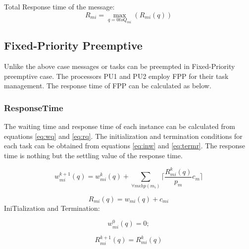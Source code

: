 Total Response time of the message:
\begin{equation}
R_{mi}=\max_{q=0toQ_{mi}}(R_{mi}(q)) 
\label{eq:respfinal}
\end{equation}


\subsection{Fixed-Priority Preemptive}
Unlike the above case messages or tasks can be preempted in Fixed-Priority preemptive case. The processors PU1 and PU2 employ FPP for their task management. The response time of FPP can be calculated as below.
\subsubsection{ResponseTime}
The waiting time and response time of each instance can be calculated from equations \ref{eq:wq} and \ref{eq:rq}. The initialization and termination conditions for each task can be obtained from equations \ref{eq:inw} and \ref{eq:termr}. The response time is nothing but the settling value of the response time.  


\begin{equation}
w_{mi}^{k+1}(q)=w_{mi}^{k}(q)+\sum_{\forall m\epsilon hp(m_i)}\lceil \frac{R_{mi}^k(q)}{p_{m}}c_m \rceil
\label{eq:wq}
\end{equation}

\begin{equation}
R_{mi}(q)=w_{mi}(q)+c_{mi}
\label{eq:rq}
\end{equation}
IniTialization and Termination:

\begin{equation}
w_{mi}^{0}(q)=0;
\label{eq:inw}
\end{equation}

\begin{equation}
R_{mi}^{k+1}(q)=R_{mi}^{k}(q)
\label{eq:termr}
\end{equation}






